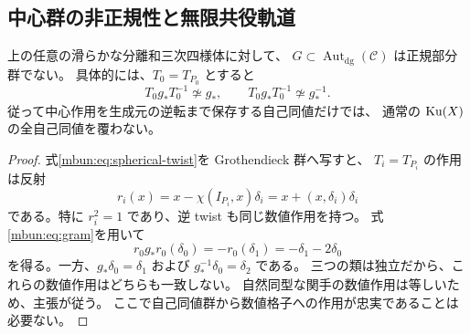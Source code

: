 \subsection{中心群の非正規性と無限共役軌道}

\begin{theorem}[通常の残余圏で中心群は正規でない]
\label{mbun:thm:non-normal}
上の任意の滑らかな分離和三次四様体に対して、
$G\subset\operatorname{Aut}_{\mathrm{dg}}(\mathcal C)$ は正規部分群でない。
具体的には、$T_0=T_{P_0}$ とすると
\[
 T_0g_*T_0^{-1}\not\simeq g_*,
 \qquad T_0g_*T_0^{-1}\not\simeq g_*^{-1}.
\]
従って中心作用を生成元の逆転まで保存する自己同値だけでは、
通常の $\operatorname{Ku}(X)$ の全自己同値を覆わない。
\end{theorem}
\begin{proof}
式\eqref{mbun:eq:spherical-twist}を Grothendieck 群へ写すと、
$T_i=T_{P_i}$ の作用は反射
\begin{equation}\label{mbun:eq:reflection}
 r_i(x)=x-\chi(I_{P_i},x)\delta_i
       =x+(x,\delta_i)\delta_i
\end{equation}
である。特に $r_i^2=1$ であり、逆 twist も同じ数値作用を持つ。
式\eqref{mbun:eq:gram}を用いて
\[
 r_0g_*r_0(\delta_0)
  =-r_0(\delta_1)
  =-\delta_1-2\delta_0
\]
を得る。一方、$g_*\delta_0=\delta_1$ および
$g_*^{-1}\delta_0=\delta_2$ である。
三つの類は独立だから、これらの数値作用はどちらも一致しない。
自然同型な関手の数値作用は等しいため、主張が従う。
ここで自己同値群から数値格子への作用が忠実であることは必要ない。
\end{proof}

